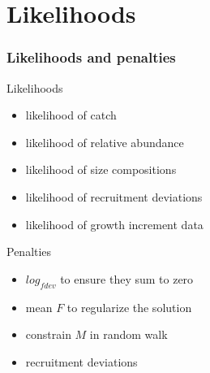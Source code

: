 \documentclass{beamer}
\begin{document}
\section{Likelihoods}


\begin{frame}
\frametitle{Likelihoods and penalties}
Likelihoods
\begin{itemize}
\item likelihood of catch
\item likelihood of relative abundance
\item likelihood of size compositions
\item likelihood of recruitment deviations
\item likelihood of growth increment data
\end{itemize}
Penalties
\begin{itemize}
\item $log_{fdev}$ to ensure they sum to zero
\item mean $F$ to regularize the solution
\item constrain $M$ in random walk
\item recruitment deviations
\end{itemize}

\end{frame}

\end{document}
